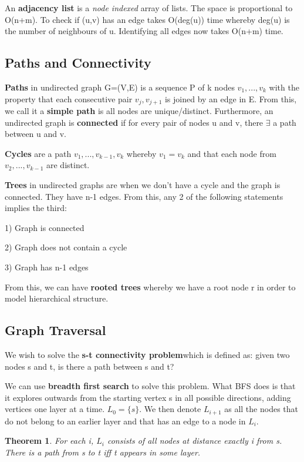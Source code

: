 \documentclass[11pt, oneside]{article}
\newtheorem{theorem}{Theorem}
\theoremstyle{definition}
\begin{document}
An \textbf{adjacency list} is a \textit{node indexed} array of lists. The space is proportional to O(n+m). To check if (u,v) has an edge takes O(deg(u)) time whereby deg(u) is the number of neighbours of u. Identifying all edges now takes O(n+m) time.

\subsection{Paths and Connectivity}
\textbf{Paths} in undirected graph G=(V,E) is a sequence P of k nodes $v_1,...,v_k$ with the property that each consecutive pair $v_j, v_{j+1}$ is joined by an edge in E. From this, we call it a \textbf{simple path} is all nodes are unique/distinct. Furthermore, an undirected graph is \textbf{connected} if for every pair of nodes u and v, there $\exists$ a path between u and v.

\textbf{Cycles} are a path $v_1,...,v_{k-1},v_k$ whereby $v_1 = v_k$ and that each node from $v_2,...,v_{k-1}$ are distinct.

\textbf{Trees} in undirected graphs are when we don't have a cycle and the graph is connected. They have n-1 edges. From this, any 2 of the following statements implies the third:

1) Graph is connected

2) Graph does not contain a cycle

3) Graph has n-1 edges

From this, we can have \textbf{rooted trees} whereby we have a root node r in order to model hierarchical structure.

\subsection{Graph Traversal}
We wish to solve the \textbf{s-t connectivity problem}which is defined as: given two nodes s and t, is there a path between s and t?

We can use \textbf{breadth first search} to solve this problem. What BFS does is that it explores outwards from the starting vertex s in all possible directions, adding vertices one layer at a time. $L_0 = \{s\}$. We then denote $L_{i+1}$ as all the nodes that do not belong to an earlier layer and that has an edge to a node in $L_i$. \\

\begin{theorem}
    For each i, $L_i$ consists of all nodes at distance exactly i from s. There is a path from s to t iff t appears in some layer.
\end{theorem}
\end{document}
